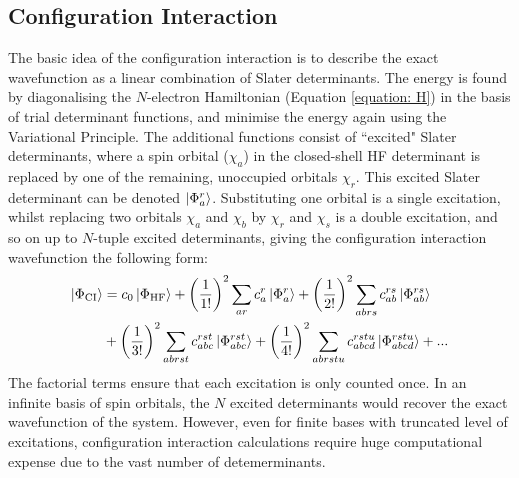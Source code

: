 \subsection{Configuration Interaction}\label{section: CI}
The basic idea of the configuration interaction is to describe the exact wavefunction as a linear combination of Slater determinants. The energy is found by diagonalising the $N$-electron Hamiltonian (Equation \ref{equation: H}) in the basis of trial determinant functions, and minimise the energy again using the Variational Principle.\cite{szabo1996} The additional functions consist of ``excited" Slater determinants, where a spin orbital ($\chi_{a}$) in the closed-shell \ac{HF} determinant is replaced by one of the remaining, unoccupied orbitals $\chi_{r}$. This excited Slater determinant can be denoted $\ket{\Phi_{a}^{r}}$.\cite{szabo1996}  Substituting one orbital is a single excitation, whilst replacing two orbitals $\chi_{a}$ and $\chi_{b}$ by $\chi_{r}$ and $\chi_{s}$ is a double excitation, and so on up to $N$-tuple excited determinants, giving the configuration interaction wavefunction the following form:\cite{szabo1996}
\begin{align}\label{equation: config_int}
\begin{split}
\ket{\Phi_{\mathrm{CI}}}&=c_{0}\ket{\Phi_{\mathrm{HF}}}+\bigg(\frac{1}{1!}\bigg)^{2}\sum_{ar}c_{a}^{r}\ket{\Phi_{a}^{r}}+\bigg(\frac{1}{2!}\bigg)^{2}\sum_{abrs}c_{ab}^{rs}\ket{\Phi_{ab}^{rs}}\\&+\bigg(\frac{1}{3!}\bigg)^{2}\sum_{abrst}c_{abc}^{rst}\ket{\Phi_{abc}^{rst}}
+\bigg(\frac{1}{4!}\bigg)^{2}\sum_{abrstu}c_{abcd}^{rstu}\ket{\Phi_{abcd}^{rstu}}+...
\end{split}
\end{align}
The factorial terms ensure that each excitation is only counted once. In an infinite basis of spin orbitals, the $N$ excited determinants would recover the exact wavefunction of the system. However, even for finite bases with truncated level of excitations, configuration interaction calculations require huge computational expense due to the vast number of detemerminants.
